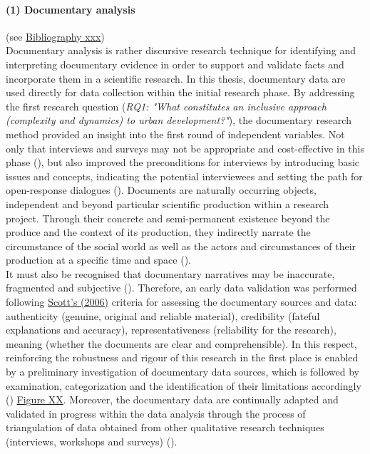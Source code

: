 \documentclass[11pt]{report}
\begin{document}
\paragraph{(1) Documentary analysis} 
(see \href{}{Bibliography xxx})
\\
Documentary analysis is rather discursive research technique for identifying and interpreting documentary evidence in order to support and validate facts and incorporate them in a scientific research. In this thesis, documentary data are used directly for data collection within the initial research phase. By addressing the first research question (\textit{RQ1: "What constitutes an inclusive approach (complexity and dynamics) to urban development?"}), the documentary research method provided an insight into the first round of independent variables. Not only that interviews and surveys may not be appropriate and cost-effective in this phase (\cite{(Mogalakwe 2006)}), but also improved the preconditions for interviews by introducing basic issues and concepts, indicating the potential interviewees and setting the path for open-response dialogues (\cite{(Robson, 1993; GRUBOVIC)}).
Documents are naturally occurring objects, independent and beyond particular scientific production within a research project. Through their concrete and semi-permanent existence beyond the produce and the context of its production, they indirectly narrate the circumstance of the social world as well as the actors and circumstances of their production at a specific time and space (\cite{((Jary and Jary 1991; Payne and Payne 2004; Mogalakwe 2006)}).
\\
It must also be recognised that documentary narratives may be inaccurate, fragmented and subjective (\cite{(Forster, 1994)}). 
Therefore, an early data validation was performed following \href{}{Scott's (2006)} criteria for assessing the documentary sources and data: authenticity (genuine, original and reliable material), credibility (fateful explanations and accuracy), representativeness (reliability for the research), meaning (whether the documents are clear and comprehensible). In this respect, reinforcing the robustness and rigour of this research in the first place is enabled by a preliminary investigation of documentary data sources, which is followed by examination, categorization and the identification of their limitations accordingly (\cite{Scoot 2004}) \href{}{Figure XX}. Moreover, the documentary data are continually adapted and validated in progress within the data analysis through the process of triangulation of data obtained from other qualitative research techniques (interviews, workshops and surveys) (\cite{(Cochrane, 1998;  Yin, 1994)}).
\end{document}
